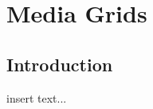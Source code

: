 \graphicspath{{chapt_dutch/}{intro/}{chapt2/}{chapt3/}{chapt4/}{chapt5/}}

\renewcommand\evenpagerightmark{{\scshape\small Chapter 5}}
\renewcommand\oddpageleftmark{{\scshape\small Media Grids}}

\renewcommand{\bibname}{References}

\hyphenation{}

\chapter[Media Grids]%
{Media Grids}
\label{ch5}

\section{Introduction}
insert text...

\clearpage




\clearpage{\pagestyle{empty}\cleardoublepage}

